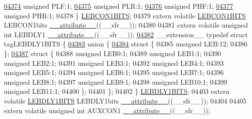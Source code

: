 \begin{DoxyCode}
\hypertarget{a00009_source_l04374}{}\hyperlink{a00008_ab72be8b35e01107182afb8e9733d72bb}{04374}   \textcolor{keywordtype}{unsigned} PLF:1;
\hypertarget{a00009_source_l04375}{}\hyperlink{a00008_a5f690459b53fc81b46dbbac226cecb25}{04375}   \textcolor{keywordtype}{unsigned} PLR:1;
\hypertarget{a00009_source_l04376}{}\hyperlink{a00008_a4ac425e6c1575269dfa33a0373584fff}{04376}   \textcolor{keywordtype}{unsigned} PHF:1;
\hypertarget{a00009_source_l04377}{}\hyperlink{a00008_ae02a9c6926c3a1feac21cec18a520e4a}{04377}   \textcolor{keywordtype}{unsigned} PHR:1;
04378 \} \hyperlink{a00008_d8/da5/a00570}{LEBCON1BITS};
04379 \textcolor{keyword}{extern} \textcolor{keyword}{volatile} \hyperlink{a00008_d8/da5/a00570}{LEBCON1BITS} LEBCON1bits \hyperlink{a00009_a493c46f03454991ccc5aa7a6e1dfb2a7}{\_\_attribute\_\_}((\_\_sfr\_\_));
04380 
04381 \textcolor{keyword}{extern} \textcolor{keyword}{volatile} \textcolor{keywordtype}{unsigned} \textcolor{keywordtype}{int}  LEBDLY1 \hyperlink{a00009_a493c46f03454991ccc5aa7a6e1dfb2a7}{\_\_attribute\_\_}((\_\_sfr\_\_));
\hypertarget{a00009_source_l04382}{}\hyperlink{a00008}{04382} \_\_extension\_\_ \textcolor{keyword}{typedef} \textcolor{keyword}{struct }tagLEBDLY1BITS \{
\hypertarget{a00009_source_l04383}{}\hyperlink{a00009}{04383}   \textcolor{keyword}{union }\{
\hypertarget{a00009_source_l04384}{}\hyperlink{a00009}{04384}     \textcolor{keyword}{struct }\{
04385       \textcolor{keywordtype}{unsigned} LEB:12;
04386     \};
\hypertarget{a00009_source_l04387}{}\hyperlink{a00009}{04387}     \textcolor{keyword}{struct }\{
04388       \textcolor{keywordtype}{unsigned} LEB0:1;
04389       \textcolor{keywordtype}{unsigned} LEB1:1;
04390       \textcolor{keywordtype}{unsigned} LEB2:1;
04391       \textcolor{keywordtype}{unsigned} LEB3:1;
04392       \textcolor{keywordtype}{unsigned} LEB4:1;
04393       \textcolor{keywordtype}{unsigned} LEB5:1;
04394       \textcolor{keywordtype}{unsigned} LEB6:1;
04395       \textcolor{keywordtype}{unsigned} LEB7:1;
04396       \textcolor{keywordtype}{unsigned} LEB8:1;
04397       \textcolor{keywordtype}{unsigned} LEB9:1;
04398       \textcolor{keywordtype}{unsigned} LEB10:1;
04399       \textcolor{keywordtype}{unsigned} LEB11:1;
04400     \};
04401   \};
04402 \} \hyperlink{a00008_d6/d21/a00573}{LEBDLY1BITS};
04403 \textcolor{keyword}{extern} \textcolor{keyword}{volatile} \hyperlink{a00008_d6/d21/a00573}{LEBDLY1BITS} LEBDLY1bits \hyperlink{a00009_a493c46f03454991ccc5aa7a6e1dfb2a7}{\_\_attribute\_\_}((\_\_sfr\_\_));
04404 
04405 \textcolor{keyword}{extern} \textcolor{keyword}{volatile} \textcolor{keywordtype}{unsigned} \textcolor{keywordtype}{int}  AUXCON1 \hyperlink{a00009_a493c46f03454991ccc5aa7a6e1dfb2a7}{\_\_attribute\_\_}((\_\_sfr\_\_));

\end{DoxyCode}
